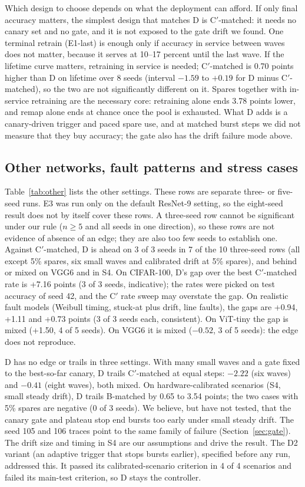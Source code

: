 \documentclass[journal]{IEEEtran}
\begin{document}
Which design to choose depends on what the deployment can afford.
If only final accuracy matters, the simplest design that matches D is C$'$-matched: it needs no canary set and no gate, and it is not exposed to the gate drift we found.
One terminal retrain (E1-last) is enough only if accuracy in service between waves does not matter, because it serves at 10--17 percent until the last wave.
If the lifetime curve matters, retraining in service is needed; C$'$-matched is 0.70 points higher than D on lifetime over 8 seeds (interval $-1.59$ to $+0.19$ for D minus C$'$-matched), so the two are not significantly different on it.
Spares together with in-service retraining are the necessary core: retraining alone ends 3.78 points lower, and remap alone ends at chance once the pool is exhausted.
What D adds is a canary-driven trigger and paced spare use, and at matched burst steps we did not measure that they buy accuracy; the gate also has the drift failure mode above.

\subsection{Other networks, fault patterns and stress cases}
\label{sec:stress}
Table~\ref{tab:other} lists the other settings.
These rows are separate three- or five-seed runs.
E3 was run only on the default ResNet-9 setting, so the eight-seed result does not by itself cover these rows.
A three-seed row cannot be significant under our rule ($n\ge5$ and all seeds in one direction), so these rows are not evidence of absence of an edge; they are also too few seeds to establish one.
Against C$'$-matched, D is ahead on 3 of 3 seeds in 7 of the 10 three-seed rows (all except 5\% spares, six small waves and calibrated drift at 5\% spares), and behind or mixed on VGG6 and in S4.
On CIFAR-100, D's gap over the best C$'$-matched rate is +7.16 points (3 of 3 seeds, indicative); the rates were picked on test accuracy of seed 42, and the C$'$ rate sweep may overstate the gap.
On realistic fault models (Weibull timing, stuck-at plus drift, line faults), the gaps are +0.94, +1.11 and +0.73 points (3 of 3 seeds each, consistent).
On ViT-tiny the gap is mixed (+1.50, 4 of 5 seeds).
On VGG6 it is mixed ($-0.52$, 3 of 5 seeds): the edge does not reproduce.

D has no edge or trails in three settings.
With many small waves and a gate fixed to the best-so-far canary, D trails C$'$-matched at equal steps: $-2.22$ (six waves) and $-0.41$ (eight waves), both mixed.
On hardware-calibrated scenarios (S4, small steady drift), D trails B-matched by 0.65 to 3.54 points; the two cases with 5\% spares are negative (0 of 3 seeds).
We believe, but have not tested, that the canary gate and plateau stop end bursts too early under small steady drift.
The seed 105 and 106 traces point to the same family of failure (Section~\ref{sec:gate}).
The drift size and timing in S4 are our assumptions and drive the result.
The D2 variant (an adaptive trigger that stops bursts earlier), specified before any run, addressed this.
It passed its calibrated-scenario criterion in 4 of 4 scenarios and failed its main-test criterion, so D stays the controller.
\end{document}
